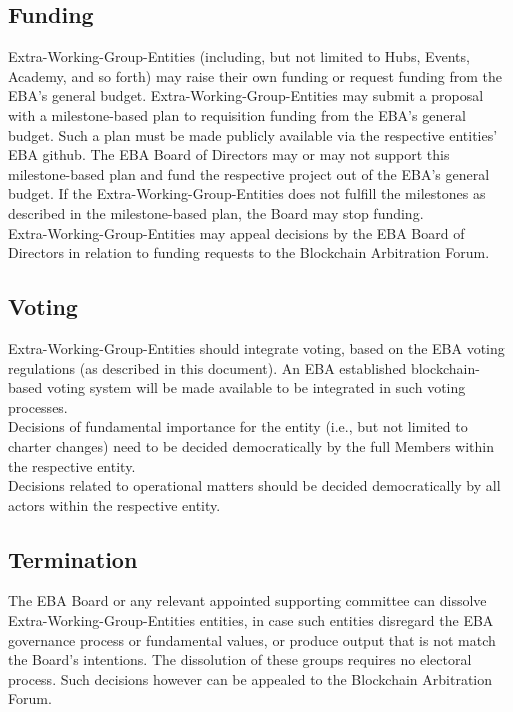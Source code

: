\documentclass{article}
\begin{document}
\subsection{Funding}

Extra-Working-Group-Entities (including, but not limited to Hubs, Events, Academy, and so forth) may raise their own funding or request funding from the EBA's general budget.
 Extra-Working-Group-Entities may submit a proposal with a milestone-based plan to requisition funding from the EBA's general budget. 
 Such a plan must be made publicly available via the respective entities' EBA github. 
 The EBA Board of Directors may or may not support this milestone-based plan and fund the respective project out of the EBA's general budget. 
 If the Extra-Working-Group-Entities does not fulfill the milestones as described in the milestone-based plan, the Board may stop funding. \\
Extra-Working-Group-Entities may appeal decisions by the EBA Board of Directors in relation to funding requests to the Blockchain Arbitration Forum.

\subsection{Voting}

Extra-Working-Group-Entities should integrate voting, based on the EBA voting regulations (as described in this document). 
An EBA established blockchain-based voting system will be made available to be integrated in such voting processes. \\
Decisions of fundamental importance for the entity (i.e., but not limited to charter changes) need to be decided democratically by the full Members within the respective entity. \\
Decisions related to operational matters should be decided democratically by all actors within the respective entity.

\subsection{Termination}

The EBA Board or any relevant appointed supporting committee can dissolve Extra-Working-Group-Entities entities, in case such entities disregard the EBA governance process or fundamental values, or produce output that is not match the Board's intentions. The dissolution of these groups requires no electoral process. Such decisions however can be appealed to the Blockchain Arbitration Forum.
\end{document}
